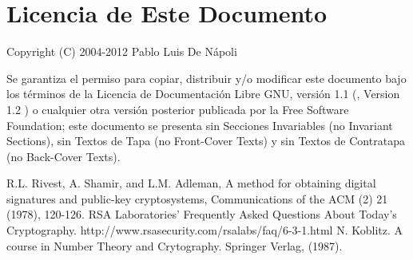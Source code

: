 \documentclass[spanish]{article}
\begin{document}
\section{Licencia de Este Documento}

Copyright (C) 2004-2012 Pablo Luis De Nápoli

Se garantiza el permiso para copiar, distribuir y/o modificar este documento
bajo los términos de la Licencia de Documentación Libre GNU, versión 1.1 
(, Version 1.2 ) 
o cualquier otra versión 
posterior publicada por la Free Software Foundation; este documento se 
presenta sin Secciones Invariables (no Invariant Sections), sin Textos de 
Tapa (no Front-Cover Texts) y sin Textos de Contratapa (no Back-Cover Texts). 


\begin{thebibliography}{Rsa-Faq}
R.L. Rivest, A. Shamir, and L.M. Adleman, A method for 
obtaining digital signatures and public-key cryptosystems, 
Communications of the ACM
(2) 21 (1978), 120-126.
\htmladdnormallink 
{RSA Laboratories' Frequently Asked Questions About Today's Cryptography.}
{http://www.rsasecurity.com/rsalabs/faq/6-3-1.html}
 N. Koblitz. A course in Number Theory and Crytography. 
Springer Verlag, (1987).

\end{thebibliography}
\end{document}
